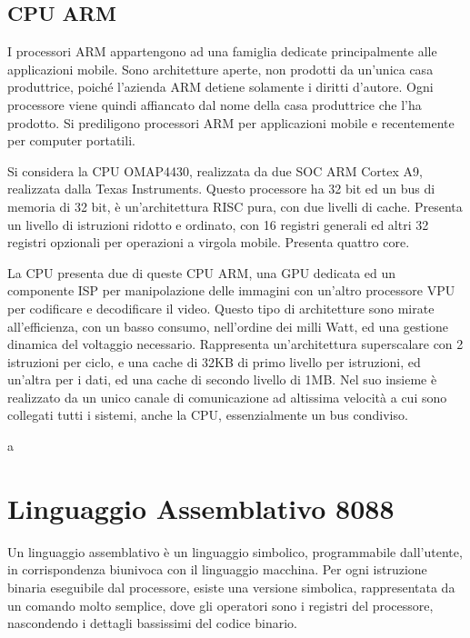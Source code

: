 \documentclass{article}
\numberwithin{equation}{subsection}
\begin{document}
\subsection{CPU ARM}

I processori ARM appartengono ad una famiglia dedicate principalmente alle applicazioni mobile. Sono architetture aperte, non prodotti da un'unica casa produttrice, poiché 
l'azienda ARM detiene solamente i diritti d'autore. Ogni processore viene quindi affiancato dal nome della casa produttrice che l'ha prodotto. Si prediligono processori ARM 
per applicazioni mobile e recentemente per computer portatili. 

Si considera la CPU OMAP4430, realizzata da due SOC ARM Cortex A9, realizzata dalla Texas Instruments. Questo processore ha 32 bit ed un bus di memoria di 32 bit, 
è un'architettura RISC pura, con due livelli di cache. Presenta un livello di istruzioni ridotto e ordinato, con 16 registri generali ed altri 32 
registri opzionali per operazioni a virgola mobile. Presenta quattro core. 

La CPU presenta due di queste CPU ARM, una GPU dedicata ed un componente ISP per manipolazione delle immagini con un'altro processore VPU per codificare e decodificare il video. 
Questo tipo di architetture sono mirate all'efficienza, con un basso consumo, nell'ordine dei milli Watt, ed una gestione dinamica del voltaggio necessario. 
Rappresenta un'architettura superscalare con 2 istruzioni per ciclo, e una cache di 32KB di primo livello per istruzioni, ed un'altra per i dati, ed una cache di secondo livello di 
1MB. 
Nel suo insieme è realizzato da un unico canale di comunicazione ad altissima velocità a cui sono collegati tutti i sistemi, anche la CPU, essenzialmente un bus condiviso. 



\clearpage


a

\section{Linguaggio Assemblativo 8088}

Un linguaggio assemblativo è un linguaggio simbolico, programmabile dall'utente, in corrispondenza biunivoca con il linguaggio macchina. Per ogni istruzione binaria eseguibile 
dal processore, esiste una versione simbolica, rappresentata da un comando molto semplice, dove gli operatori sono i registri del processore, nascondendo i dettagli bassissimi 
del codice binario. 
\end{document}
